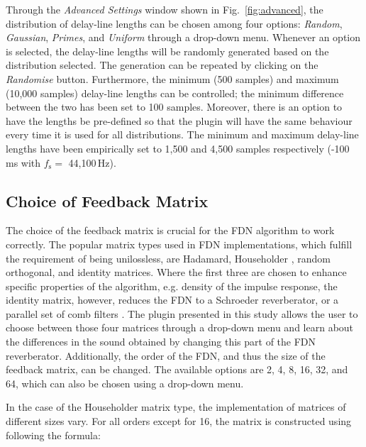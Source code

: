 \documentclass[twoside,a4paper]{article}
\newcommand{\silvin}[1]{\textcolor{ForestGreen}{#1}}
\begin{document}
Through the \textit{Advanced Settings} window shown in Fig.~\ref{fig:advanced}, the distribution of delay-line lengths can be chosen among four options: \textit{Random}, \textit{Gaussian}, \textit{Primes}, and \textit{Uniform} through a drop-down menu. Whenever an option is selected, the delay-line lengths will be randomly generated based on the distribution selected. The generation can be repeated by clicking on the \textit{Randomise} button. Furthermore, the minimum (500 samples) and maximum (10,000 samples) delay-line lengths can be controlled; the minimum difference between the two has been set to 100 samples. 
Moreover, there is an option to have the lengths be pre-defined so that the plugin will have the same behaviour every time it is used for all distributions. The minimum and maximum delay-line lengths have been empirically set to 1,500 and 4,500 samples respectively (-100\,ms with $f_\text{s} =$  44,100\,Hz).


\subsection{Choice of Feedback Matrix}

The choice of the feedback matrix is crucial for the FDN algorithm to work correctly. The popular matrix types used in FDN implementations, which fulfill the requirement of being unilossless, are Hadamard, Householder \cite{Jot:1997:icm}, random orthogonal, and identity matrices. Where the first three are chosen to enhance specific properties of the algorithm, e.g. density of the impulse response, the identity matrix, however, reduces the FDN to a Schroeder reverberator, or a parallel set of comb filters \cite{Jot:Chaine:1991:aes, menzer2010unitary}. The plugin presented in this study allows the user to choose between those four matrices through a drop-down menu and learn about the differences in the sound obtained by changing this part of the FDN reverberator. %
%
Additionally, the order of the FDN, and thus the size of the feedback matrix, can be changed. The available options are 2, 4, 8, 16, 32, and 64, which can also be chosen using a drop-down menu. %

In the case of the Householder matrix type, the implementation of matrices of different sizes vary. For all orders except for 16, the matrix is constructed using following the formula:
\end{document}
